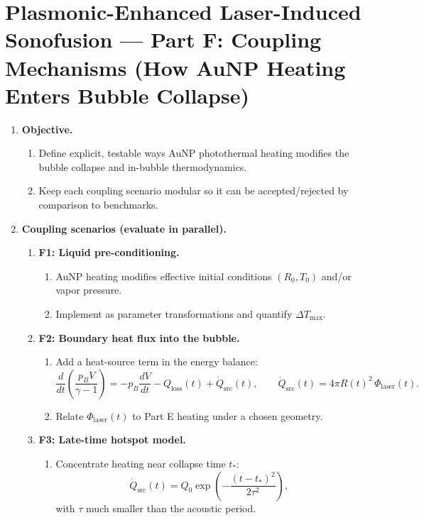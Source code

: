 \documentclass[11pt]{article}
\begin{document}
	\section{Plasmonic-Enhanced Laser-Induced Sonofusion --- Part F: Coupling Mechanisms (How AuNP Heating Enters Bubble Collapse)}
	\begin{enumerate}
		\item \textbf{Objective.}
		\begin{enumerate}
			\item Define explicit, testable ways AuNP photothermal heating modifies the bubble collapse and in-bubble thermodynamics.
			\item Keep each coupling scenario modular so it can be accepted/rejected by comparison to benchmarks.
		\end{enumerate}
		
		\item \textbf{Coupling scenarios (evaluate in parallel).}
		\begin{enumerate}
			\item \textbf{F1: Liquid pre-conditioning.}
			\begin{enumerate}
				\item AuNP heating modifies effective initial conditions $(R_0,T_0)$ and/or vapor pressure.
				\item Implement as parameter transformations and quantify $\Delta T_{\max}$.
			\end{enumerate}
			
			\item \textbf{F2: Boundary heat flux into the bubble.}
			\begin{enumerate}
				\item Add a heat-source term in the energy balance:
				\[
				\frac{d}{dt}\left(\dfrac{p_B V}{\gamma-1}\right)
				=
				-p_B\frac{dV}{dt}
				-\dot Q_{\mathrm{loss}}(t)
				+\dot Q_{\mathrm{src}}(t),
				\qquad
				\dot Q_{\mathrm{src}}(t)=4\pi R(t)^2\,\Phi_{\mathrm{laser}}(t).
				\]
				\item Relate $\Phi_{\mathrm{laser}}(t)$ to Part E heating under a chosen geometry.
			\end{enumerate}
			
			\item \textbf{F3: Late-time hotspot model.}
			\begin{enumerate}
				\item Concentrate heating near collapse time $t_{\ast}$:
				\[
				\dot Q_{\mathrm{src}}(t)=Q_0\exp\!\left(-\dfrac{(t-t_{\ast})^2}{2\tau^2}\right),
				\]
				with $\tau$ much smaller than the acoustic period.
			\end{enumerate}
		\end{enumerate}
		

\end{enumerate}
\end{document}
